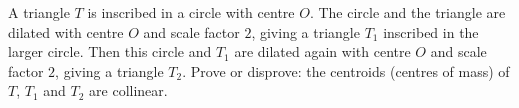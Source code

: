 A triangle $T$ is inscribed in a circle with centre $O$. The circle and the triangle are dilated with centre $O$ and scale factor $2$, giving a triangle $T_1$ inscribed in the larger circle. Then this circle and $T_1$ are dilated again with centre $O$ and scale factor $2$, giving a triangle $T_2$. Prove or disprove: the centroids (centres of mass) of $T$, $T_1$ and $T_2$ are collinear.
